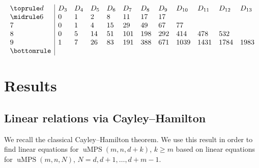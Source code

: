 \documentclass[pdftex]{sigma}
\numberwithin{equation}{section}
\DeclareMathOperator{\uMPS}{uMPS}
\begin{document}
 \begin{table}[th!]\centering
	\caption{Character of $I(\uMPS(2,2,d))^*_3$. Since $D_{w}=D_{3d-w}$, we only list $D_w$ for $w \leq \big\lceil \frac{3d}{2}\big\rceil$.}  \label{table:character3}

\vspace{-5mm}

$$
	\begin{array}{l|lllllllllll}
	\toprule
	d & D_3 & D_4 & D_5 & D_6 & D_7 & D_8 & D_9 & D_{10} & D_{11} & D_{12} & D_{13}\\
	\midrule
	6 & 0 & 1 &  2 &  8 &  11 &  17 &  17 &      &      &      &      \\
	7 & 0 & 1 &  4 & 15 &  29 &  49 &  67 &   77 &      &      &      \\
	8 & 0 & 5 & 14 & 51 & 101 & 198 & 292 &  414 & 478  & 532  &      \\
	9 & 1 & 7 & 26 & 83 & 191 & 388 & 671 & 1039 & 1431 & 1784 & 1983 \\
	\bottomrule
	\end{array}$$
\vspace{-2mm}
\end{table}

\section{Results} \label{sec:results}

 \subsection{Linear relations via Cayley--Hamilton} \label{sec:CH}
We recall the classical Cayley--Hamilton theorem.
We use this result in order to find linear equations for ${\uMPS(m,n,d+k)}$, $k\geq m$ based on linear equations for ${\uMPS(m,n,N)}$, $N=d,d+1,\dots,d+m-1$.
\end{document}
